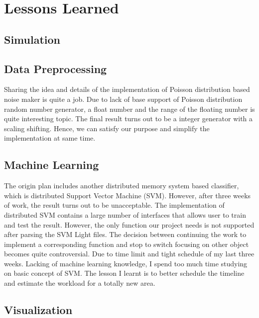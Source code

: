 \section{Lessons Learned}
\label{lessons}

\subsection{Simulation}


\subsection{Data Preprocessing}

Sharing the idea and details of the implementation of Poisson distribution based noise maker is quite a job. Due to lack of base support of Poisson distribution random number generator, a float number and the range of the floating number is quite interesting topic. The final result turns out to be a integer generator with a scaling shifting. Hence, we can satisfy our purpose and simplify the implementation at same time.



\subsection{Machine Learning}

The origin plan includes another distributed memory system based classifier, which is distributed Support Vector Machine (SVM). However, after three weeks of work, the result turns out to be unacceptable. The implementation of distributed SVM contains a large number of interfaces that allows user to train and test the result. However, the only function our project needs is not supported after parsing the SVM Light files. The decision between continuing the work to implement a corresponding function and stop to switch focusing on other object becomes quite controversial. Due to time limit and tight schedule of my last three weeks. Lacking of machine learning knowledge, I spend too much time studying on basic concept of SVM. The lesson I learnt is to better schedule the timeline and estimate the workload for a totally new area.



\subsection{Visualization}